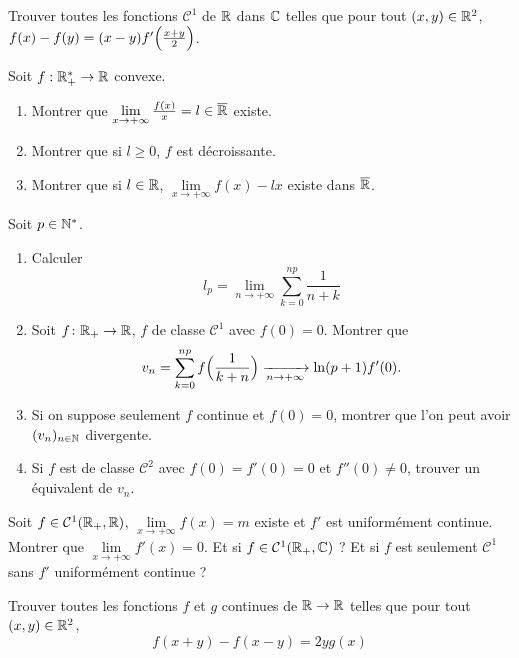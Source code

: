 \documentclass[12pt]{article}
\begin{document}
\begin{exercise}
	Trouver toutes les fonctions $\mathcal{C}^{1}$ de $\mathbb{R}$ dans $\mathbb{C}$ telles que pour tout $(x,y)\in\mathbb{R}^{2}$, $f(x)-f(y)=(x-y)f'\Bigl(\frac{x+y}{2}\Bigr)$.
\end{exercise}

\begin{exercise}
	Soit $f:\mathbb{R}_{+}^{*}\to\mathbb{R}$ convexe.
	\begin{enumerate}
		\item Montrer que $\lim\limits_{x\to+\infty}\frac{f(x)}{x}=l\in\overline{\mathbb{R}}$ existe.
		\item Montrer que si $l\geqslant0$, $f$ est décroissante.
		\item Montrer que si $l\in\mathbb{R}$, $\lim\limits_{x\to+\infty}f(x)-lx$ existe dans $\overline{\mathbb{R}}$.
	\end{enumerate}
\end{exercise}

\begin{exercise}
	Soit $p\in\mathbb{N}^{*}$.
	\begin{enumerate}
		\item Calculer 
		$$l_{p}=\lim\limits_{n\to+\infty}\sum_{k=0}^{np}\frac{1}{n+k}$$
		\item Soit $f\colon\mathbb{R}_{+}\to\mathbb{R}$, $f$ de classe $\mathcal{C}^{1}$ avec $f(0)=0$. Montrer que 
		$$v_{n}=\sum_{k=0}^{np}f\Bigl(\frac{1}{k+n}\Bigr)\xrightarrow[n\to+\infty]{}\ln(p+1)f'(0).$$
		\item Si on suppose seulement $f$ continue et $f(0)=0$, montrer que l'on peut avoir $(v_{n})_{n\in\mathbb{N}}$ divergente.
		\item Si $f$ est de classe $\mathcal{C}^{2}$ avec $f(0)=f'(0)=0$ et $f''(0)\neq0$, trouver un équivalent de $v_{n}$.
	\end{enumerate}
\end{exercise}

\begin{exercise}
	Soit $f\in\mathcal{C}^{1}(\mathbb{R}_{+},\mathbb{R})$, $\lim\limits_{x\to+\infty}f(x)=m$ existe et $f'$ est uniformément continue. Montrer que $\lim\limits_{x\to+\infty}f'(x)=0$. Et si $f\in\mathcal{C}^{1}(\mathbb{R}_{+},\mathbb{C})$ ? Et si $f$ est seulement $\mathcal{C}^{1}$ sans $f'$ uniformément continue ?
\end{exercise}

\begin{exercise}
	Trouver toutes les fonctions $f$ et $g$ continues de $\mathbb{R}\to\mathbb{R}$ telles que pour tout $(x,y)\in\mathbb{R}^{2}$,
	$$f(x+y)-f(x-y)=2yg(x)$$
\end{exercise}
\end{document}
